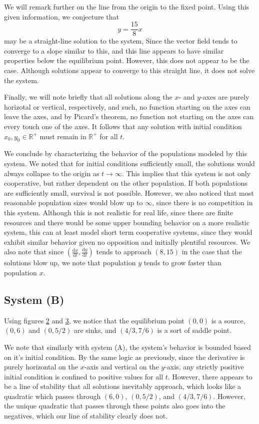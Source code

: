 \documentclass[11pt, letterpaper]{article}
\begin{document}
We will remark further on the line from the origin to the fixed point. Using this given information, we conjecture that
\[
	y=\frac{15}{8}x
\]
may be a straight-line solution to the system, Since the vector field tends to converge to a slope similar to this, and this line appears to have similar properties below the equilibrium point. However, this does not appear to be the case. Although solutions appear to converge to this straight line, it does not solve the system.

Finally, we will note briefly that all solutions along the $x$- and $y$-axes are purely horizotal or vertical,  respectively, and such, no function starting on the axes can leave the axes, and by Picard's theorem, no function not starting on the axes can every touch one of the axes. It follows that any solution with initial condition $x_0,y_0\in\mathbb{R}^+$ must remain in $\mathbb{R}^+$ for all $t$.

We conclude by characterizing the behavior of the populations modeled by this system. We noted that for initial conditions sufficiently small, the solutions would always collapse to the origin as $t\to \infty$. This implies that this system is not only cooperative, but rather dependent on the other population. If both populations are sufficiently small, survival is not possible. However, we also noticed that most reasonable population sizes would blow up to $\infty$, since there is no competition in this system. Although this is not realistic for real life, since there are finite resources and there would be some upper bounding behavior on a more realistic system, this can at least model short term cooperative systems, since they would exhibit similar behavior given no opposition and initially plentiful resources. We also note that since $\left( \frac{\mathrm{d}x}{\mathrm{d}t},\frac{\mathrm{d}y}{\mathrm{d}t}   \right) $ tends to approach $\left( 8,15 \right) $ in the case that the solutions blow up, we note that population $y$ tends to grow faster than population $x$.
\subsection{System (B)}
Using figures \hyperref[fig:2]{2} and \hyperref[fig:3]{3}, we notice that the equilibrium point $(0,0)$ is a source, $(0,6)$ and $(0,5/2)$ are sinks, and $(4 /3,7 /6)$ is a sort of saddle point.

We note that similarly with system (A), the system's behavior is bounded based on it's initial condition. By the same logic as previously, since the derivative is purely horizontal on the $x$-axis and vertical on the $y$-axis, any strictly positive initial condition is confined to positive values for all $t$. However, there appears to be a line of stability that all solutions inevitably approach, which looks like a quadratic which passes through $(6,0)$, $(0, 5/2)$, and $(4 /3,7 /6)$. However, the unique quadratic that passes through these points also goes into the negatives, which our line of stability clearly does not.
\end{document}
